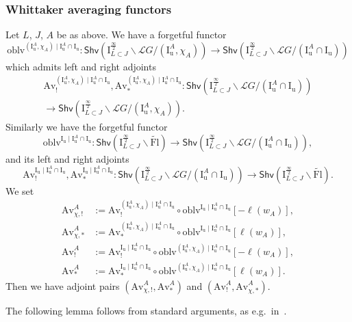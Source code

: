 \documentclass[11pt]{amsart}
\numberwithin{equation}{section}
\theoremstyle{plain}
\theoremstyle{definition}
\newcommand{\I}{{\mathrm I}}
\renewcommand{\k}{\Bbbk}
\newcommand{\sL}{{\mathcal L}}
\newcommand{\semi}{{{\frac{\infty}{2}}}}
\newcommand{\quar}{{{\frac{\infty}{4}}}}
\newcommand{\oblv}{\mathrm{oblv}}
\newcommand{\Av}{\mathrm{Av}}
\newcommand{\Shv}{\mathsf{Shv}}
\newcommand{\Fl}{\mathrm{Fl}}
\newcommand{\tFl}{\widetilde{\Fl}}
\newcommand{\Iu}{\mathrm{I}_{\mathrm{u}}}
\begin{document}
\subsubsection{Whittaker averaging functors} 
\label{sss:av-fun}

Let $L$, $J$, $A$ be as above.
We have a forgetful functor 
\[
\oblv^{(\Iu^A,\chi_A)\mid \Iu^A \cap \Iu}: 
\Shv \left( \I_{L \subset J}^{\semi}\backslash \sL G/(\Iu^A,\chi_A) \right) \rightarrow \Shv \left( \I_{L \subset J}^{\semi}\backslash \sL G/(\Iu^A \cap \Iu) \right)
\]
which admits left and right adjoints 
\begin{multline*}
\Av^{(\Iu^A,\chi_A)\mid \Iu^A \cap \Iu}_!, \Av^{(\Iu^A,\chi_A)\mid \Iu^A \cap \Iu}_* : \Shv \left( \I_{L \subset J}^{\semi}\backslash \sL G/(\Iu^A \cap \Iu) \right) \\
\to \Shv \left( \I_{L \subset J}^{\semi}\backslash \sL G/(\Iu^A,\chi_A) \right).
\end{multline*}
Similarly we have the forgetful functor 
\[
\oblv^{\Iu\mid \Iu^A \cap \Iu}: \Shv \left( \I_{L \subset J}^{\semi} \backslash \tFl \right) \rightarrow \Shv \left( \I_{L \subset J}^{\semi}\backslash \sL G/(\Iu^A \cap \Iu) \right),
\]
and its left and right adjoints 
\[
\Av^{\Iu\mid \Iu^A \cap \Iu}_!, \Av^{\Iu\mid \Iu^A \cap \Iu}_* : \Shv \left( \I_{L \subset J}^{\semi}\backslash \sL G/(\Iu^A \cap \Iu) \right) \to \Shv \left( \I_{L \subset J}^{\semi} \backslash \tFl \right).
\]
We set 
\begin{align*}
\Av^A_{\chi,!} &:= \Av^{(\Iu^A,\chi_A)\mid \Iu^A \cap \Iu}_! \circ \oblv^{\Iu\mid \Iu^A \cap \Iu}[-\ell(w_A)], \\ 
\Av^A_{\chi,*} &:= \Av^{(\Iu^A,\chi_A)\mid \Iu^A \cap \Iu}_* \circ \oblv^{\Iu\mid \Iu^A \cap \Iu}[\ell(w_A)], \\
\Av^A_{!} &:= \Av^{\Iu\mid \Iu^A \cap \Iu}_! \circ \oblv^{(\Iu^A,\chi_A)\mid \Iu^A \cap \Iu}[-\ell(w_A)], \\ 
\Av^A_{*} &:= \Av^{\Iu\mid \Iu^A \cap \Iu}_* \circ \oblv^{(\Iu^A,\chi_A)\mid \Iu^A \cap \Iu}[\ell(w_A)].
\end{align*}
Then we have adjoint pairs $(\Av^A_{\chi,!},\Av^A_{*})$ and $(\Av^A_{!},\Av^A_{\chi,*})$. 

The following lemma follows from standard arguments, as e.g.~in~\cite[Lemma~3.2]{AR23}.
\end{document}
